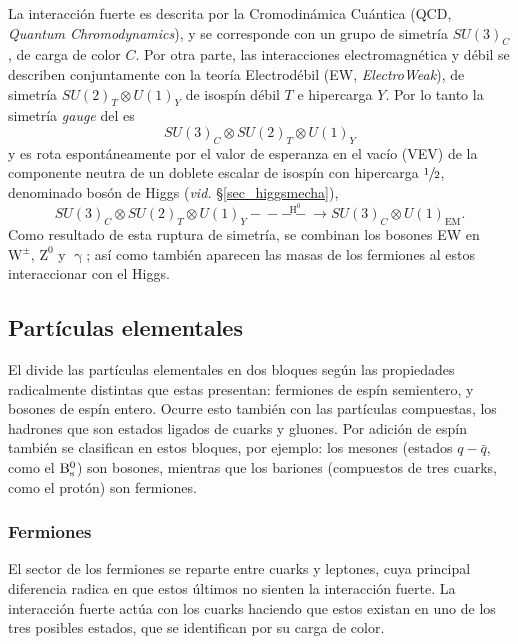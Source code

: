 La interacción fuerte es descrita por la Cromodinámica Cuántica (QCD, \emph{Quantum Chromodynamics}), y se corresponde con un grupo de simetría $SU(3)_{C}$, de carga de color $C$. Por otra parte, las interacciones electromagnética y débil se describen conjuntamente con la teoría Electrodébil (EW, \textit{ElectroWeak}), de simetría $SU(2)_T \otimes U(1)_Y $ de isospín débil $T$ e hipercarga $Y$. Por lo tanto la simetría \emph{gauge} del \stdmod es 
\[SU(3)_{C}\otimes SU(2)_T \otimes U(1)_Y \]
y es rota espontáneamente por el valor de esperanza en el vacío (VEV) de la componente neutra de un doblete escalar de isospín con hipercarga $\sfrac{1}{2}$, denominado bosón de Higgs (\emph{vid.} \S \ref{sec_higgsmecha}),
\begin{equation}
	SU(3)_{C}\otimes SU(2)_T \otimes U(1)_Y -\!\!\!\!-\!\!\!\overset{\mathrm{H^0}}{-\!\!-}\!\!\!\rightarrow SU(3)_C \otimes U(1)_{\text{EM}}.
\end{equation}
Como resultado de esta ruptura de simetría, se combinan los bosones EW en $\mathrm{W^{\pm},\, Z^{0}}$ y $\upgamma$; así como también aparecen las masas de los fermiones al estos interaccionar con el Higgs.




\subsection{Partículas elementales} %

El \stdmod divide las partículas elementales en dos bloques según las propiedades radicalmente distintas que estas presentan: fermiones de espín semientero, y bosones de espín entero. \color{vero} Ocurre esto también con las partículas compuestas,  los hadrones que son estados ligados de cuarks y gluones. \color{norm} Por adición de espín también se clasifican en estos bloques, por ejemplo: los mesones (estados $q-\bar{q}$, como el $\text{B}{}_{\text{s}}^{0}$) son bosones, mientras que los bariones (compuestos de tres cuarks, como el protón) son fermiones.


\subsubsection{Fermiones} %

El sector de los fermiones se reparte entre cuarks y leptones, cuya principal diferencia radica en que estos últimos no sienten la interacción fuerte. 
La interacción fuerte \color{vero} actúa \color{norm} con los cuarks haciendo que estos existan en uno de los tres posibles estados, que se identifican por su carga de color.

